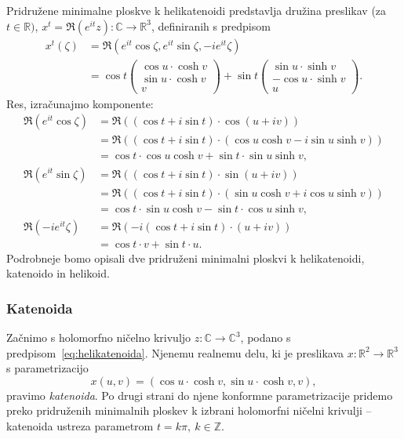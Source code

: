 \documentclass[12pt,a4paper,twoside]{article}
\theoremstyle{definition} %
\theoremstyle{plain} %
\numberwithin{equation}{section}  %
\begin{document}
Pridružene minimalne ploskve k helikatenoidi predstavlja družina preslikav (za $t \in \mathbb{R})$, $x^{t} = \Re (e^{it} z) \colon \mathbb{C} \to \mathbb{R}^3$, definiranih s predpisom
%
\begin{align} \label{eq:pridruzene-helikatenoida}
x^{t}(\zeta) &= \Re (e^{it} \cos \zeta, e^{it} \sin \zeta, -i e^{it} \zeta) \nonumber \\
	&= \cos t  
		\begin{pmatrix}
		\cos u \cdot \cosh v \\
		\sin u \cdot \cosh v \\
		v
         	\end{pmatrix}
	+ \sin t
		\begin{pmatrix}
		\sin u \cdot \sinh v \\
		-\cos u \cdot \sinh v \\
		u
         	\end{pmatrix}.
\end{align}
%
Res, izračunajmo komponente:
\begin{align*}
\Re (e^{it} \cos \zeta) &= \Re \left( (\cos t + i\sin t) \cdot \cos(u+iv) \right) \\
	&= \Re \left( (\cos t + i\sin t) \cdot (\cos u \cosh v - i\sin u \sinh v) \right) \\
	&= \cos t \cdot \cos u \cosh v + \sin t \cdot \sin u \sinh v, \\
\Re (e^{it} \sin \zeta) &= \Re \left( (\cos t + i\sin t) \cdot \sin(u+iv) \right) \\
	&= \Re \left( (\cos t + i\sin t) \cdot (\sin u \cosh v + i\cos u \sinh v) \right) \\
	&= \cos t \cdot \sin u \cosh v - \sin t \cdot \cos u \sinh v, \\
\Re (-i e^{it} \zeta) &= \Re \left( -i(\cos t + i\sin t) \cdot (u+iv) \right) \\
	&= \cos t \cdot v + \sin t \cdot u.
\end{align*}
Podrobneje bomo opisali dve pridruženi minimalni ploskvi k helikatenoidi, katenoido in helikoid.

\subsubsection{Katenoida}
%
Začnimo s holomorfno ničelno krivuljo $z \colon \mathbb{C} \to \mathbb{C}^3$, podano s predpisom~\eqref{eq:helikatenoida}. Njenemu realnemu delu, ki je preslikava $x \colon \mathbb{R}^2 \to \mathbb{R}^3$ s parametrizacijo
\begin{equation} \label{eq:katenoida}
x(u,v) = (\cos u \cdot \cosh v, \sin u \cdot \cosh v, v),
\end{equation}
pravimo \emph{katenoida}. Po drugi strani do njene konformne parametrizacije pridemo preko pridruženih minimalnih ploskev k izbrani holomorfni ničelni krivulji -- katenoida ustreza parametrom $t = k \pi, \ k \in \mathbb{Z}$.
\end{document}
